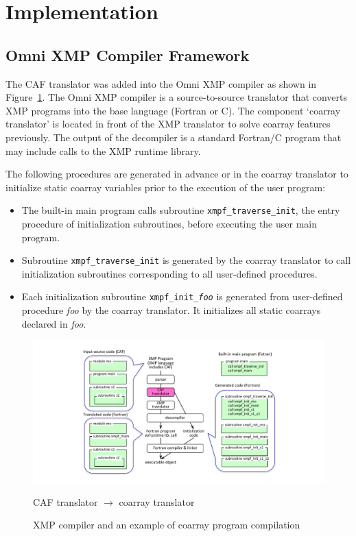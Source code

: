\section{Implementation}\label{sec:implement}

\subsection{Omni XMP Compiler Framework}

The CAF translator was added into the Omni XMP compiler as shown in Figure~\ref{fig:translator}.
The Omni XMP compiler is a source-to-source translator that converts XMP programs 
into the base language (Fortran or C).  The component `coarray translator' is 
located in front of the XMP translator to solve coarray features previously. 
The output of the decompiler is a standard Fortran/C program that may include 
calls to the XMP runtime library.

The following procedures are generated in advance or in the coarray translator
to initialize static coarray variables prior to the execution of the user program:
\begin{itemize}
\item
The built-in main program calls subroutine {\tt xmpf\_traverse\_init},
the entry procedure of initialization subroutines, before executing the
user main program.
\item
Subroutine {\tt xmpf\_traverse\_init} is generated by the coarray translator 
to call initialization subroutines corresponding to all user-defined procedures.
\item
Each initialization subroutine {\tt xmpf\_init\_{\it foo}} is generated from 
user-defined procedure {\it foo} by the coarray translator. 
It initializes all static coarrays declared in {\it foo}.
\end{itemize}

\begin{figure}[tbh]
 \begin{center}
  \includegraphics[trim=30mm 0mm 20mm 7mm, scale=1.0]{figs/translator-tmp.pdf}
  \caption{XMP compiler and an example of coarray program compilation}
  \label{fig:translator}
  CAF translator $\rightarrow$ coarray translator
 \end{center}
\end{figure}


